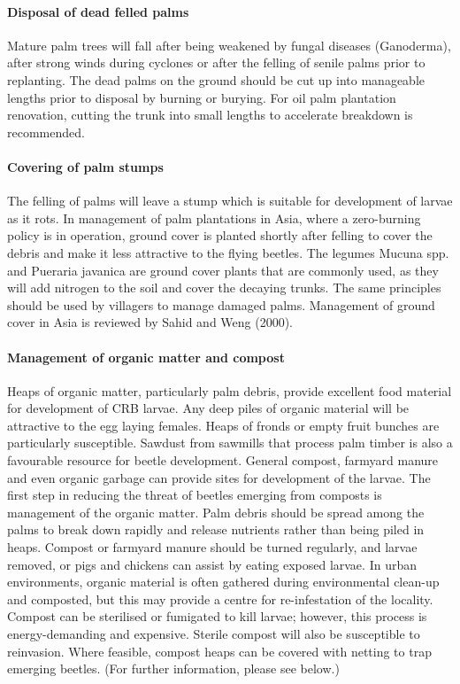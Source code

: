 \documentclass[twocolumn,letterpaper]{scrartcl}
\begin{document}
\paragraph{Disposal of dead felled palms}
Mature palm trees will fall after being weakened by fungal diseases (Ganoderma), after strong winds during cyclones or after the felling of senile palms prior to replanting. The dead palms on the ground should be cut up into manageable lengths prior to disposal by burning or burying. For oil palm plantation renovation, cutting the trunk into small lengths to accelerate breakdown is recommended.

\paragraph{Covering of palm stumps}
The felling of palms will leave a stump which is suitable for development of larvae as it rots. In management of palm plantations in Asia, where a zero-burning policy is in operation, ground cover is planted shortly after felling to cover the debris and make it less attractive to the flying beetles. The legumes Mucuna spp. and Pueraria javanica are ground cover plants that are commonly used, as they will add nitrogen to the soil and cover the decaying trunks. The same principles should be used by villagers to manage damaged palms. Management of ground cover in Asia is reviewed by Sahid and Weng (2000).

\paragraph{Management of organic matter and compost}
Heaps  of  organic  matter,  particularly  palm  debris,  provide  excellent  food  material  for  development  of  CRB larvae. Any deep piles of organic material will be attractive to the egg laying females. Heaps of fronds or empty fruit bunches are particularly susceptible. Sawdust from sawmills that process palm timber is also a favourable resource for beetle development. General compost, farmyard manure and even organic garbage can provide 
sites for development of the larvae. The first step in reducing the threat of beetles emerging from composts is management of the organic matter. Palm debris should be spread among the palms to break down rapidly and 
release nutrients rather than being piled in heaps. Compost or farmyard manure should be turned regularly, and larvae removed, or pigs and chickens can assist by eating exposed larvae. In urban environments, organic 
material is often gathered during environmental clean-up and composted, but this may provide a centre for re-infestation of the locality. Compost can be sterilised or fumigated to kill larvae; however, this process is energy-demanding  and  expensive.  Sterile  compost  will  also  be  susceptible  to  reinvasion.  Where  feasible,  compost heaps can be covered with netting to trap emerging beetles. (For further information, please see below.) 
\end{document}
